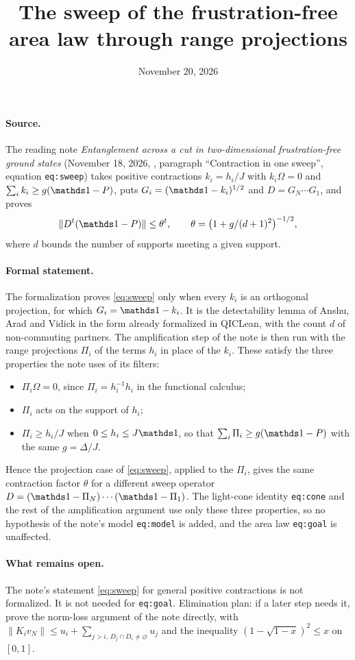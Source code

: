 \documentclass{article}
\title{The sweep of the frustration-free area law through range projections}
\author{}
\date{November 20, 2026}
\begin{document}
\maketitle
{}

\paragraph{Source.}
The reading note \emph{Entanglement across a cut in two-dimensional
    frustration-free ground states} (November 18, 2026,
,
paragraph ``Contraction in one sweep'', equation \texttt{eq:sweep}) takes
positive contractions $k_i=h_i/J$ with $k_i\Omega=0$ and
$\sum_ik_i\ge g(\Id-P)$, puts $G_i=(\Id-k_i)^{1/2}$ and $D=G_N\cdots G_1$, and
proves
\begin{equation}
    \|D^t(\Id-P)\|\le\theta^t,\qquad \theta=\bigl(1+g/(d+1)^2\bigr)^{-1/2},
    \label{eq:sweep}
\end{equation}
where $d$ bounds the number of supports meeting a given support.

\paragraph{Formal statement.}
The formalization proves \eqref{eq:sweep} only when every $k_i$ is an
orthogonal projection, for which $G_i=\Id-k_i$. It is the detectability lemma
of Anshu, Arad and Vidick in the form already formalized in QICLean, with the
count $d$ of non-commuting partners. The amplification step of the note is
then run with the range projections $\Pi_i$ of the terms $h_i$ in place of the
$k_i$. These satisfy the three properties the note uses of its filters:
\begin{itemize}
    \item $\Pi_i\Omega=0$, since $\Pi_i=h_i^{-1}h_i$ in the functional calculus;
    \item $\Pi_i$ acts on the support of $h_i$;
    \item $\Pi_i\ge h_i/J$ when $0\le h_i\le J\Id$, so that
          $\sum_i\Pi_i\ge g(\Id-P)$ with the same $g=\Delta/J$.
\end{itemize}
Hence the projection case of \eqref{eq:sweep}, applied to the $\Pi_i$, gives
the same contraction factor $\theta$ for a different sweep operator
$D=(\Id-\Pi_N)\cdots(\Id-\Pi_1)$. The light-cone identity
\texttt{eq:cone} and the rest of the amplification argument use only these
three properties, so no hypothesis of the note's model \texttt{eq:model} is
added, and the area law \texttt{eq:goal} is unaffected.

\paragraph{What remains open.}
The note's statement \eqref{eq:sweep} for general positive contractions is not
formalized. It is not needed for \texttt{eq:goal}. Elimination plan: if a later
step needs it, prove the norm-loss argument of the note directly, with
$\|K_iv_N\|\le u_i+\sum_{j>i,\,D_j\cap D_i\ne\varnothing}u_j$ and the
inequality $(1-\sqrt{1-x})^2\le x$ on $[0,1]$.
\end{document}
